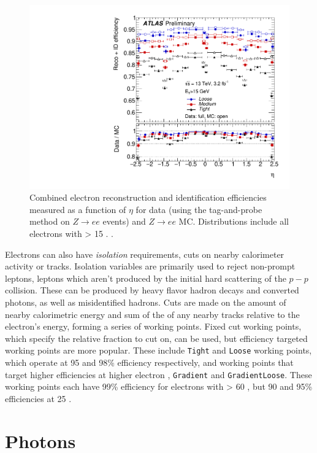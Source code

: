 \begin{centering}
\begin{figure}[!hbt]
\myfloatalign
\includegraphics[width=.90\linewidth]{figures/reco/fig_14b.pdf}
\caption{ Combined electron reconstruction and identification efficiencies measured as a function of $\eta$ for data (using the tag-and-probe method on $Z\rightarrow ee$ events) and $Z\rightarrow ee$ \ac{MC}. Distributions include all electrons with \et > 15 \gev. \cite{ATLAS-CONF-2016-024}.}
\label{fig:reco_el_sf}
\end{figure}
\end{centering}

Electrons can also have \textit{isolation} requirements, cuts on nearby calorimeter activity or tracks. Isolation variables are primarily used to reject non-prompt leptons, leptons which aren't produced by the initial hard scattering of the $p-p$ collision. These can be produced by heavy flavor hadron decays and converted photons, as well as misidentified hadrons. Cuts are made on the amount of nearby calorimetric energy and sum of the \pt of any nearby tracks relative to the electron's energy, forming a series of working points. Fixed cut working points, which specify the relative fraction to cut on, can be used, but efficiency targeted working points are more popular. These include \texttt{Tight} and \texttt{Loose} working points, which operate at 95 and 98\% efficiency respectively, and working points that target higher efficiencies at higher electron \pt, \texttt{Gradient} and \texttt{GradientLoose}. These working points each have 99\% efficiency for electrons with \pt > 60 \gev, but 90 and 95\% efficiencies at 25 \gev. 

\section{Photons}
\label{sec:reco_photons}

